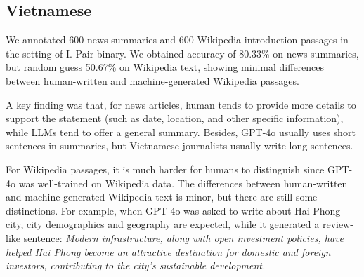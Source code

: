 \subsection{Vietnamese}
We annotated 600 news summaries and 600 Wikipedia introduction passages in the setting of I. Pair-binary. 
We obtained accuracy of 80.33\% on news summaries, but random guess 50.67\% on Wikipedia text, showing minimal differences between human-written and machine-generated Wikipedia passages.

A key finding was that, for news articles, human tends to provide more details to support the statement (such as date, location, and other specific information), while LLMs tend to offer a general summary. Besides, GPT-4o usually uses short sentences in summaries, but Vietnamese journalists usually write long sentences.

For Wikipedia passages, it is much harder for humans to distinguish since GPT-4o was well-trained on Wikipedia data.
The differences between human-written and machine-generated Wikipedia text is minor, but there are still some distinctions.
For example, when GPT-4o was asked to write about Hai Phong city, city demographics and geography are expected, while it generated a review-like sentence:
\textit{Modern infrastructure, along with open investment policies, have helped Hai Phong become an attractive destination for domestic and foreign investors, contributing to the city's sustainable development.}

